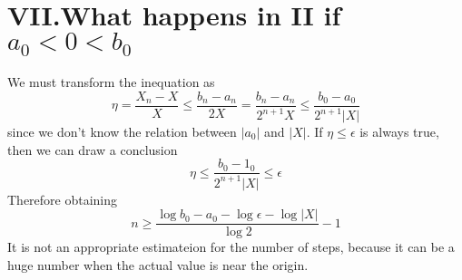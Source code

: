 \documentclass[twoside,a4paper,12pt]{article}
\begin{document}
\section*{VII.What happens in II if $a_0 < 0 < b_0$}
We must transform the inequation as 
\[
\eta = \frac{X_n-X}{X} \le \frac{b_n-a_n}{2X} = \frac{b_n-a_n}{2^{n+1}X} \le \frac{b_0-a_0}{2^{n+1}|X|}
\]
since we don't know the relation between $|a_0|$ and $|X|$. If $\eta \le \epsilon$ is always true, then we can draw a conclusion
\[
\eta \le \frac{b_0-1_0}{2^{n+1}|X|} \le \epsilon
\]
Therefore obtaining
\[
n \ge \frac{\log{b_0-a_0}-\log{\epsilon}-\log{|X|}}{\log{2}}-1
\]
It is not an appropriate estimateion for the number of steps, because it can be a huge number when the actual value is near the origin. 
\end{document}
